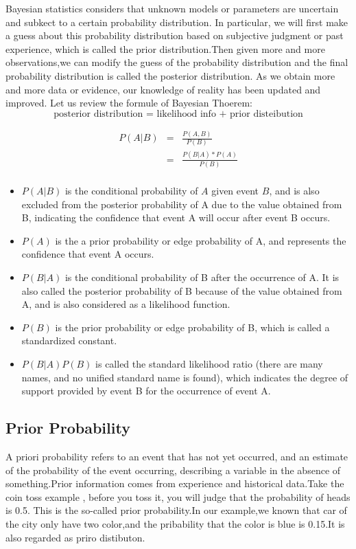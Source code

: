Bayesian statistics considers that unknown models or parameters are uncertain and subkect to a certain probability distribution.
In particular, we will first make a guess about this probability distribution based on subjective judgment or past experience, which is called the prior distribution.Then given more and more observations,we can modify the guess of the probability distribution and the final probability distribution is called the posterior distribution. As we obtain more and more data or evidence, our knowledge of reality has been updated and improved.
Let us review the formule of Bayesian Thoerem:
$$ \text{posterior distribution = likelihood info + prior disteibution}$$

\begin{eqnarray*}
P(A|B) &=& \frac{P(A,B)}{P(B)} \\
& = &\frac{P(B|A)*P(A)}{P(B)} \\
\end{eqnarray*}
\begin{itemize}
  \item $P(A | B)$ is the conditional probability of $A$ given event $B$, and is also excluded from the posterior probability of A due to the value obtained from B, indicating the confidence that event A will occur after event B occurs.

  \item $P(A)$ is the a prior probability or edge probability of A, and represents the confidence that event A occurs.

  \item $P(B|A)$ is the conditional probability of B after the occurrence of A. It is also called the posterior probability of B because of the value obtained from A, and is also considered as a likelihood function.

  \item $P(B)$ is the prior probability or edge probability of B, which is called a standardized constant.

  \item $P(B | A) P(B)$ is called the standard likelihood ratio (there are many names, and no unified standard name is found), which indicates the degree of support provided by event B for the occurrence of event A.
\end{itemize}
\subsection{Prior Probability}

A priori probability refers to an event that has not yet occurred, and an estimate of the probability of the event occurring, describing a variable in the absence of something.Prior information comes from experience and historical data.Take the coin toss example , before you toss it, you will judge that the probability of heads is 0.5. This is the so-called prior probability.In our example,we known that car of the city only have two color,and the pribability that the color is blue is 0.15.It is also regarded as priro distibuton.



